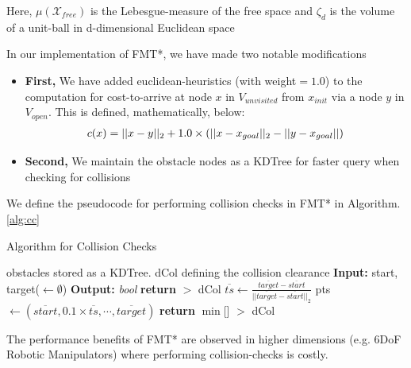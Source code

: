 \documentclass{article}
\begin{document}
Here, $\mu(\mathcal{X}_{free})$ is the Lebesgue-measure of the free space and $\zeta_d$ is the volume of a unit-ball in d-dimensional Euclidean space

In our implementation of FMT*, we have made two notable modifications
\begin{itemize}
	\item[]\textbf{First,} We have added euclidean-heuristics (with weight$=1.0$) to the computation for cost-to-arrive at node $x$ in $V_{unvisited}$ from $x_{init}$ via a node $y$ in $V_{open}$. This is defined, mathematically, below:
	\begin{align}
		c(x) = ||x - y||_2 + 1.0 \times \left( ||x - x_{goal}||_2 - ||y - x_{goal}|| \right) \notag
	\end{align}
	\item[]\textbf{Second,} We maintain the obstacle nodes as a KDTree for faster query when checking for collisions
\end{itemize}

We define the pseudocode for performing collision checks in FMT* in Algorithm. \ref{alg:cc}
\begin{algorithm}[H]
\caption{Algorithm for Collision Checks}\label{alg:cc}
	\begin{algorithmic}[1]
	\Require obstacles stored as a KDTree. dCol defining the collision clearance
	\State \textbf{Input: } start, target($\leftarrow \emptyset$) 
	\State \textbf{Output: } \textit{bool} 
			\State \textbf{return}  $>$ dCol
		\EndIf
		\State $\overline{ts} \longleftarrow \frac{\overline{target} - \overline{start}}{||\overline{target} - \overline{start}||_2}$ 
		\State pts $\longleftarrow (\overline{start}, 0.1\times\overline{ts}, \cdots, \overline{target})$ 
		\State \textbf{return} $\min$[] $>$ dCol
	\EndFunction
	\end{algorithmic}
\end{algorithm}

The performance benefits of FMT* are observed in higher dimensions (e.g. 6DoF Robotic Manipulators) where performing collision-checks is costly.
\end{document}
